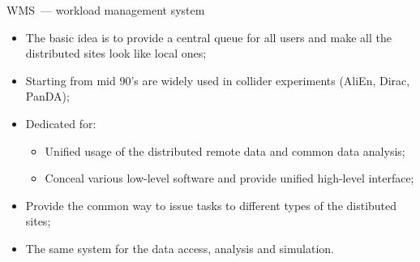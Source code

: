 \documentclass[18pt]{beamer}
\begin{document}
\begin{frame}{WMS~--- workload management system}
\begin{itemize}
  \item The basic idea is to provide a central queue for all users and make all the distributed sites look like local ones;
  \item Starting from mid 90's are widely used in collider experiments (AliEn, Dirac, PanDA);
  \item Dedicated for:
  \begin{itemize}
  \item Unified usage of the distributed remote data and common data analysis;
  \item Conceal various low-level software and provide unified high-level interface;
  \end{itemize}
  \item Provide the common way to issue tasks to different types of the distibuted sites;
  \item 
  The same system for the data access, analysis and simulation.
\end{itemize}
\end{frame}
\end{document}
